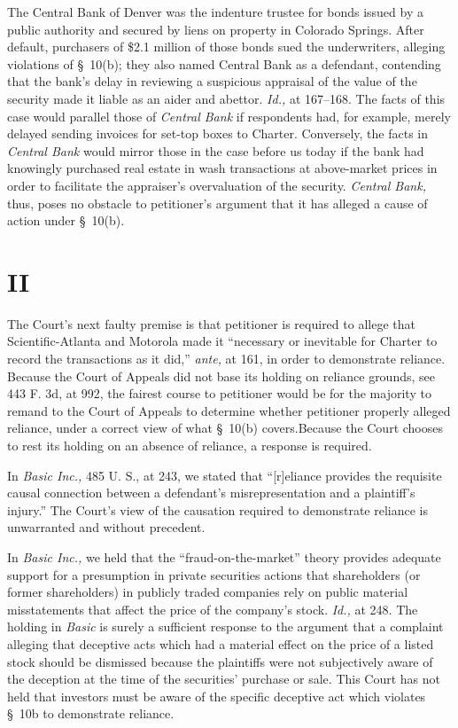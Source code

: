   The Central Bank of Denver was the indenture trustee for bonds issued by a public authority and secured by liens on property in Colorado Springs. After default, purchasers of \$2.1 million of those bonds sued the underwriters, alleging violations of \S~10(b); they also named Central Bank as a defendant, contending that the bank's delay in reviewing a suspicious appraisal of the value of the security made it liable as an aider and abettor. \emph{Id.,} at 167--168. The facts of this case would parallel those of \emph{Central Bank} if respondents had, for example, merely delayed sending invoices for set-top boxes to Charter. Conversely, the facts in \emph{Central Bank} would mirror those in the case before us today if the bank had knowingly purchased real estate in wash transactions at above-market prices in order to facilitate the appraiser's overvaluation of the security. \emph{Central Bank,} thus, poses no \newpage  obstacle to petitioner's argument that it has alleged a cause of action under \S~10(b).

\section{II}

  The Court's next faulty premise is that petitioner is required to allege that Scientific-Atlanta and Motorola made it ``necessary or inevitable for Charter to record the transactions as it did,'' \emph{ante,} at 161, in order to demonstrate reliance. Because the Court of Appeals did not base its holding on reliance grounds, see 443 F. 3d, at 992, the fairest course to petitioner would be for the majority to remand to the Court of Appeals to determine whether petitioner properly alleged reliance, under a correct view of what \S~10(b) covers.\footnotemark[3] Because the Court chooses to rest its holding on an absence of reliance, a response is required.

  In \emph{Basic Inc.,} 485 U. S., at 243, we stated that ``[r]eliance provides the requisite causal connection between a defendant's misrepresentation and a plaintiff's injury.'' The Court's view of the causation required to demonstrate reliance is unwarranted and without precedent.

  In \emph{Basic Inc.,} we held that the ``fraud-on-the-market'' theory provides adequate support for a presumption in private securities actions that shareholders (or former shareholders) in publicly traded companies rely on public material misstatements that affect the price of the company's stock. \emph{Id.,} at 248. The holding in \emph{Basic} is surely a sufficient response to the argument that a complaint alleging that deceptive acts \newpage  which had a material effect on the price of a listed stock should be dismissed because the plaintiffs were not subjectively aware of the deception at the time of the securities' purchase or sale. This Court has not held that investors must be aware of the specific deceptive act which violates \S~10b to demonstrate reliance.

